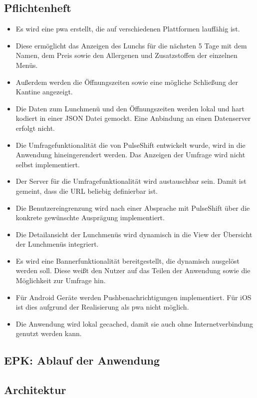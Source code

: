 \subsection{Pflichtenheft}

\begin{itemize}
\item Es wird eine \gls{pwa} erstellt, die auf verschiedenen Plattformen lauffähig ist. 
\item Diese ermöglicht das Anzeigen des Lunchs für die nächsten 5 Tage mit dem Namen, dem Preis sowie den Allergenen und Zusatzstoffen der einzelnen Menüs. 
\item Außerdem werden die Öffnungszeiten sowie eine mögliche Schließung der Kantine angezeigt.
\item Die Daten zum Lunchmenü und den Öffnungszeiten werden lokal und hart kodiert in einer JSON Datei gemockt. Eine Anbindung an einen Datenserver erfolgt nicht. 
\item Die Umfragefunktionalität die von PulseShift entwickelt wurde, wird in die Anwendung hineingerendert werden. Das Anzeigen der Umfrage wird nicht selbst implementiert. 
\item Der Server für die Umfragefunktionalität wird austauschbar sein. Damit ist gemeint, dass die URL beliebig definierbar ist.
\item Die Benutzereingrenzung wird nach einer Absprache mit PulseShift über die konkrete gewünschte Ausprägung implementiert.
\item Die Detailansicht der Lunchmenüs wird dynamisch in die View der Übersicht der Lunchmenüs integriert.
\item Es wird eine Bannerfunktionalität bereitgestellt, die dynamisch ausgelöst werden soll. Diese weißt den Nutzer auf das Teilen der Anwendung sowie die Möglichkeit zur Umfrage hin.
\item Für Android Geräte werden Pushbenachrichtigungen implementiert. Für iOS ist dies aufgrund der Realisierung als \gls{pwa} nicht möglich.
\item Die Anwendung wird lokal gecached, damit sie auch ohne Internetverbindung genutzt werden kann.
\end{itemize}

\subsection{EPK: Ablauf der Anwendung}

\subsection{Architektur}

